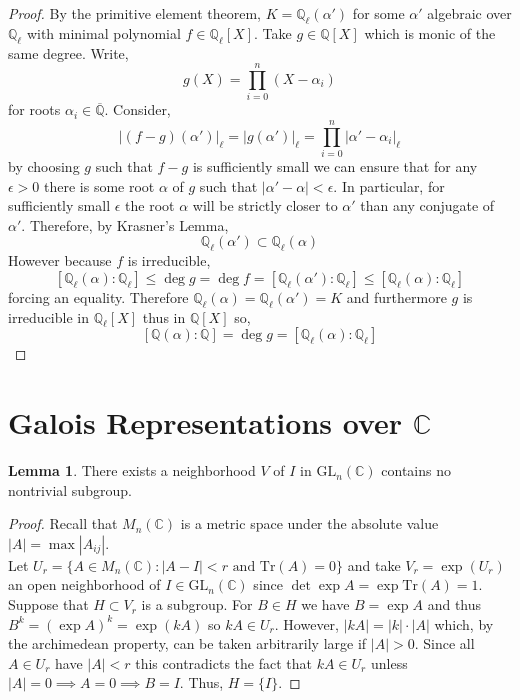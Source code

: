 \documentclass[12pt]{article}
\newcommand{\C}{\mathbb{C}}
\newcommand{\Q}{\mathbb{Q}}
\newcommand{\tr}[1]{\mathrm{Tr} \! \left(#1\right)}
\newcommand{\GL}[2]{\mathrm{GL}_{#1}(#2)}
\theoremstyle{remark}
\theoremstyle{definition}
\newtheorem{lemma}[theorem]{Lemma}
\begin{document}
\begin{proof}
By the primitive element theorem, $K = \Q_{\ell}(\alpha')$ for some $\alpha'$ algebraic over $\Q_{\ell}$ with minimal polynomial $f \in \Q_{\ell}[X]$. Take $g \in \Q[X]$ which is monic of the same degree. Write,
\[ g(X) = \prod_{i = 0}^n (X - \alpha_i) \]
for roots $\alpha_i \in \overline{\Q}$.
Consider,
\[ |(f - g)(\alpha')|_{\ell} = |g(\alpha')|_{\ell} = \prod_{i = 0}^n |\alpha' - \alpha_i|_{\ell} \] 
by choosing $g$ such that $f - g$ is sufficiently small we can ensure that for any $\epsilon > 0$ there is some root $\alpha$ of $g$ such that $|\alpha' - \alpha| < \epsilon$. In particular, for sufficiently small $\epsilon$ the root $\alpha$ will be strictly closer to $\alpha'$ than any conjugate of $\alpha'$. Therefore, by Krasner's Lemma,
\[ \Q_{\ell}(\alpha') \subset \Q_{\ell}(\alpha) \]
However because $f$ is irreducible,
\[ [\Q_{\ell}(\alpha) : \Q_{\ell}] \le \deg{g} = \deg{f} = [\Q_{\ell}(\alpha') : \Q_{\ell}] \le [\Q_{\ell}(\alpha) : \Q_{\ell}]  \]
forcing an equality. Therefore $\Q_{\ell}(\alpha) = \Q_{\ell}(\alpha') = K$ and furthermore $g$ is irreducible in $\Q_{\ell}[X]$ thus in $\Q[X]$ so,
 \[ [\Q(\alpha) : \Q] = \deg{g} = [\Q_{\ell}(\alpha) : \Q_{\ell} ] \]
\end{proof}

\section{Galois Representations over $\C$}


\begin{lemma} \label{lem:no_subgroups_of_nbd}
There exists a neighborhood $V$ of $I$ in $\GL{n}{\C}$ contains no nontrivial subgroup.
\end{lemma}
\begin{proof}
Recall that $M_n(\C)$ is a metric space under the absolute value $|A| = \max |A_{ij}|$.
\\
Let $U_r = \{A \in M_n(\C) : |A - I| < r \text{ and } \tr{A} = 0 \}$ and take $V_r = \exp(U_r)$ an open neighborhood of $I \in \GL{n}{\C}$ since $\det{\exp{A}} = \exp{\tr{A}} = 1$. Suppose that $H \subset V_r$ is a subgroup. For $B \in H$ we have $B = \exp{A}$ and thus $B^k = (\exp{A})^k = \exp{(kA)}$ so $kA \in U_r$. However, $|k A| = |k| \cdot |A|$ which, by the archimedean property, can be taken arbitrarily large if $|A| > 0$. Since all $A \in U_r$ have $|A| < r$ this contradicts the fact that $k A \in U_r$ unless $|A| = 0 \implies A = 0 \implies B = I$. Thus, $H = \{ I \}$.  
\end{proof}
\end{document}

